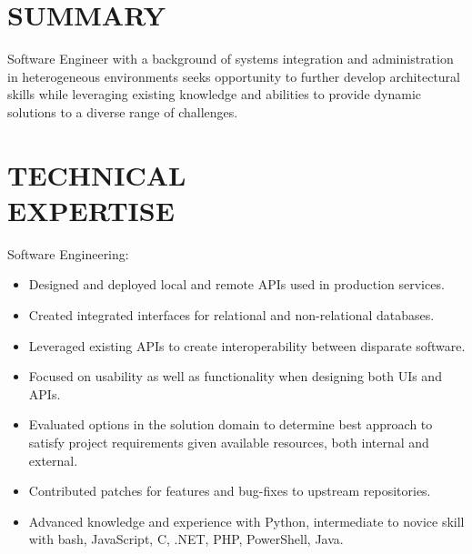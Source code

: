 \documentclass[line,margin]{res}
\begin{document}


 
\begin{resume}
 
\section{SUMMARY}
    Software Engineer with a background of systems integration and
    administration in heterogeneous environments seeks opportunity to
    further develop architectural skills while leveraging existing
    knowledge and abilities to provide dynamic solutions to a diverse
    range of challenges.




\section{TECHNICAL \\ EXPERTISE}

    Software Engineering:
    \vspace{1 mm}
    \begin{itemize}
        \item Designed and deployed local and remote APIs used in
            production services.
        \item Created integrated interfaces for relational and
            non-relational databases.
        \item Leveraged existing APIs to create interoperability between
            disparate software.
        \item Focused on usability as well as functionality when designing
            both UIs and APIs.
        \item Evaluated options in the solution domain to determine best
            approach to satisfy project requirements given available
            resources, both internal and external.
        \item Contributed patches for features and bug-fixes to upstream
            repositories.
        \item Advanced knowledge and experience with Python, intermediate
            to novice skill with bash, JavaScript, C, .NET, PHP, PowerShell,
            Java.
    \end{itemize}


\end{resume}
\end{document}
